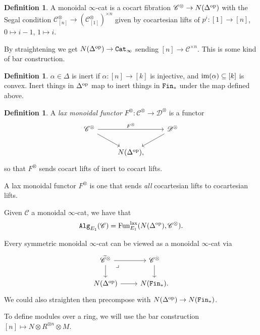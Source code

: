 \documentclass[12pt]{amsart}
\theoremstyle{definition}
\newtheorem{definition}[theorem]{Definition}
\begin{document}
\begin{definition} A monoidal $\infty$-cat is a cocart fibration $\mathscr{C}^\otimes \to N(\Delta^{\text{op}})$ with the Segal condition $\mathscr{C}^\otimes_{[n]} \to \left( \mathscr{C}^\otimes_{[1]} \right)^{\times n}$ given by cocartesian lifts of $p^i : [1] \to [n]$, $0\mapsto i-1$, $1\mapsto i$.
\end{definition}

By straightening we get $N(\Delta^{\text{op}}) \to \texttt{Cat}_\infty$ sending $[n] \to \mathscr{C}^{\times n}$. This is some kind of bar construction.

\begin{definition} $\alpha \in \Delta$ is inert if $\alpha:[n] \to [k]$ is injective, and $\text{im}(\alpha) \subseteq [k]$ is convex. Inert things in $\Delta^{\text{op}}$ map to inert things in $\texttt{Fin}_\ast$ under the map defined above.
\end{definition}

\begin{definition} A \textit{lax monoidal functor} $F^\otimes: \mathscr{C}^\otimes \to \mathscr{D}^\otimes$ is a functor
\[ \begin{tikzcd}
    \mathscr{C}^\otimes\ar[rr,"F^\otimes" above]\ar[dr] &  & \mathscr{D}^\otimes\ar[dl]\\
     & N(\Delta^\op), & 
\end{tikzcd} \]
so that $F^\otimes$ sends cocart lifts of inert to cocart lifts.
\end{definition}

A lax monoidal functor $F^\otimes$ is one that sends \textit{all} cocartesian lifts to cocartesian lifts.

Given $\mathscr{C}$ a monoidal $\infty$-cat, we have that
\begin{align*}
    \texttt{Alg}_{E_1}(\mathscr{C}) = \text{Fun}_{E_1}^{\text{lax}}(N(\Delta^{\text{op}}),\mathscr{C}^\otimes).
\end{align*}

Every symmetric monoidal $\infty$-cat can be viewed as a monoidal $\infty$-cat via
\[ \begin{tikzcd}
    \widetilde{\mathscr{C}}^\otimes\rar\dar\pb & \mathscr{C}^\otimes\dar\\
    N(\Delta^\op)\rar & N(\Fin_\ast).
\end{tikzcd} \]
We could also straighten then precompose with $N(\Delta^{\text{op}}) \to N(\texttt{Fin}_\ast)$.

To define modules over a ring, we will use the bar construction $[n] \mapsto N \otimes R^{\otimes n} \otimes M$.
\end{document}
